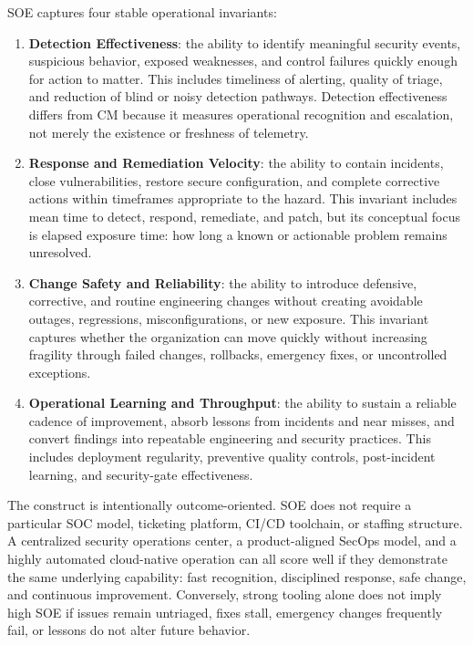 \documentclass[11pt]{article}
\begin{document}
SOE captures four stable operational invariants:
\begin{enumerate}
  \item \textbf{Detection Effectiveness}: the ability to identify meaningful security
    events, suspicious behavior, exposed weaknesses, and control failures quickly enough
    for action to matter. This includes timeliness of alerting, quality of triage, and
    reduction of blind or noisy detection pathways. Detection effectiveness differs from
    CM because it measures operational recognition and escalation, not merely the
    existence or freshness of telemetry.
  \item \textbf{Response and Remediation Velocity}: the ability to contain incidents,
    close vulnerabilities, restore secure configuration, and complete corrective actions
    within timeframes appropriate to the hazard. This invariant includes mean time to
    detect, respond, remediate, and patch, but its conceptual focus is elapsed exposure
    time: how long a known or actionable problem remains unresolved.
  \item \textbf{Change Safety and Reliability}: the ability to introduce defensive,
    corrective, and routine engineering changes without creating avoidable outages,
    regressions, misconfigurations, or new exposure. This invariant captures whether the
    organization can move quickly without increasing fragility through failed changes,
    rollbacks, emergency fixes, or uncontrolled exceptions.
  \item \textbf{Operational Learning and Throughput}: the ability to sustain a reliable
    cadence of improvement, absorb lessons from incidents and near misses, and convert
    findings into repeatable engineering and security practices. This includes deployment
    regularity, preventive quality controls, post-incident learning, and security-gate
    effectiveness.
\end{enumerate}

The construct is intentionally outcome-oriented. SOE does not require a particular SOC
model, ticketing platform, CI/CD toolchain, or staffing structure. A centralized
security operations center, a product-aligned SecOps model, and a highly automated
cloud-native operation can all score well if they demonstrate the same underlying
capability: fast recognition, disciplined response, safe change, and continuous
improvement. Conversely, strong tooling alone does not imply high SOE if issues remain
untriaged, fixes stall, emergency changes frequently fail, or lessons do not alter
future behavior.
\end{document}
